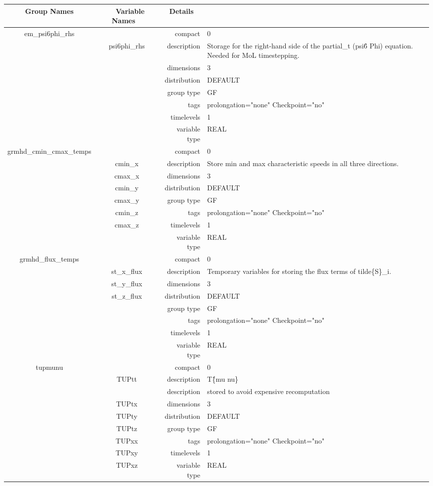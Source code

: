 \begin{tabular*}{150mm}{|c|c@{\extracolsep{\fill}}|rl|} \hline 
~ {\bf Group Names} ~ & ~ {\bf Variable Names} ~  &{\bf Details} ~ & ~ \\ 
\hline 
em\_psi6phi\_rhs &  & compact & 0 \\ 
 & psi6phi\_rhs & description & Storage for the right-hand side of the partial\_t (psi\^6 Phi) equation. Needed for MoL timestepping. \\ 
 &  & dimensions & 3 \\ 
 &  & distribution & DEFAULT \\ 
 &  & group type & GF \\ 
 &  & tags & prolongation="none" Checkpoint="no" \\ 
 &  & timelevels & 1 \\ 
 &  & variable type & REAL \\ 
\hline 
grmhd\_cmin\_cmax\_temps &  & compact & 0 \\ 
 & cmin\_x & description & Store min and max characteristic speeds in all three directions. \\ 
 & cmax\_x & dimensions & 3 \\ 
 & cmin\_y & distribution & DEFAULT \\ 
 & cmax\_y & group type & GF \\ 
 & cmin\_z & tags & prolongation="none" Checkpoint="no" \\ 
 & cmax\_z & timelevels & 1 \\ 
 &  & variable type & REAL \\ 
\hline 
grmhd\_flux\_temps &  & compact & 0 \\ 
 & st\_x\_flux & description & Temporary variables for storing the flux terms of tilde\{S\}\_i. \\ 
 & st\_y\_flux & dimensions & 3 \\ 
 & st\_z\_flux & distribution & DEFAULT \\ 
 &  & group type & GF \\ 
 &  & tags & prolongation="none" Checkpoint="no" \\ 
 &  & timelevels & 1 \\ 
 &  & variable type & REAL \\ 
\hline 
tupmunu &  & compact & 0 \\ 
 & TUPtt & description & T\^\{mu nu\} \\ 
& ~ & description &  stored to avoid expensive recomputation \\ 
 & TUPtx & dimensions & 3 \\ 
 & TUPty & distribution & DEFAULT \\ 
 & TUPtz & group type & GF \\ 
 & TUPxx & tags & prolongation="none" Checkpoint="no" \\ 
 & TUPxy & timelevels & 1 \\ 
 & TUPxz & variable type & REAL \\ 
\hline 
\end{tabular*} 


